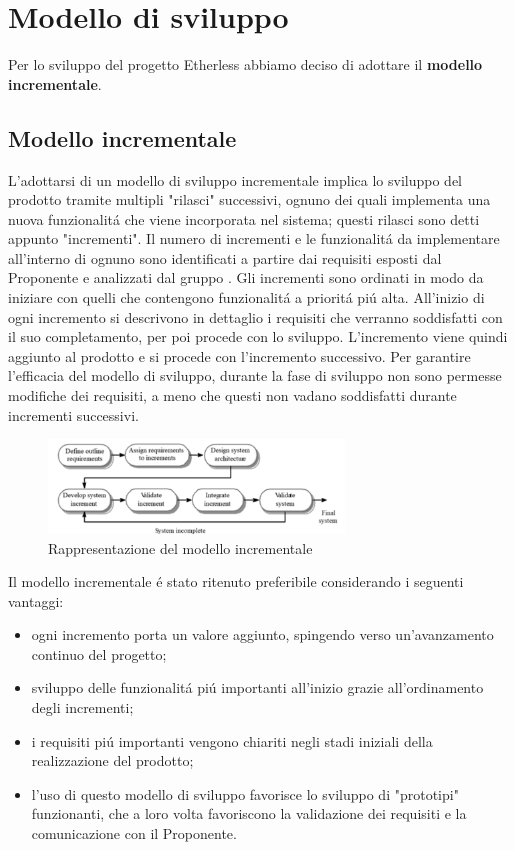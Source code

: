 \section{Modello di sviluppo}
Per lo sviluppo del progetto Etherless abbiamo deciso di adottare il \textbf{modello incrementale}.
  \subsection{Modello incrementale}
    L'adottarsi di un modello di sviluppo incrementale implica lo sviluppo del prodotto tramite multipli "rilasci" successivi, ognuno dei quali implementa una nuova funzionalitá che viene incorporata nel sistema; questi rilasci sono detti appunto "incrementi". Il numero di incrementi e le funzionalitá da implementare all'interno di ognuno sono identificati a partire dai requisiti esposti dal Proponente e analizzati dal gruppo \Gruppo{}. Gli incrementi sono ordinati in modo da iniziare con quelli che contengono funzionalitá a prioritá piú alta. All'inizio di ogni incremento si descrivono in dettaglio i requisiti che verranno soddisfatti con il suo completamento, per poi procede con lo sviluppo. L'incremento viene quindi aggiunto al prodotto e si procede con l'incremento successivo. Per garantire l'efficacia del modello di sviluppo, durante la fase di sviluppo non sono permesse modifiche dei requisiti, a meno che questi non vadano soddisfatti durante incrementi successivi.\\
    \begin{figure}[h]
			\centering
			\includegraphics[width=0.7\textwidth]{./res/img/modello_incr.png}
			\caption{Rappresentazione del modello incrementale}
		\end{figure}
    Il modello incrementale é stato ritenuto preferibile considerando i seguenti vantaggi:
    \begin{itemize}
      \item ogni incremento porta un valore aggiunto, spingendo verso un'avanzamento continuo del progetto;
      \item sviluppo delle funzionalitá piú importanti all'inizio grazie all'ordinamento degli incrementi;
      \item i requisiti piú importanti vengono chiariti negli stadi iniziali della realizzazione del prodotto;
      \item l'uso di questo modello di sviluppo favorisce lo sviluppo di "prototipi" funzionanti, che a loro volta favoriscono la validazione dei requisiti e la comunicazione con il Proponente.
    \end{itemize}
